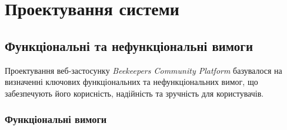 \chapter{Проектування системи}
\label{ch:design}

\section{Функціональні та нефункціональні вимоги}
\label{sec:requirements}
Проектування веб-застосунку \textit{Beekeepers Community Platform} базувалося на визначенні ключових функціональних та нефункціональних вимог, що забезпечують його корисність, надійність та зручність для користувачів.

\subsection{Функціональні вимоги}
